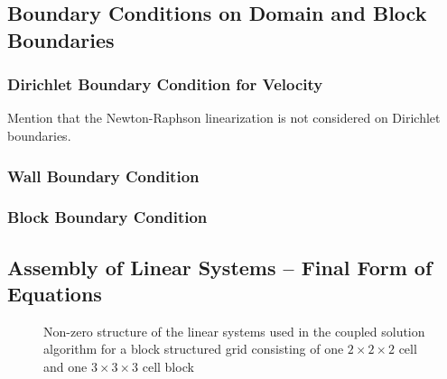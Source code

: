 \subsection{Boundary Conditions on Domain and Block Boundaries}

\subsubsection{Dirichlet Boundary Condition for Velocity}

Mention that the Newton-Raphson linearization is not considered on Dirichlet boundaries.


\subsubsection{Wall Boundary Condition}

\subsubsection{Block Boundary Condition}

\subsection{Assembly of Linear Systems -- Final Form of Equations}

\begin{figure}
  \centering
  \label{fig:segassemble}
  
  \caption{Non-zero structure of the linear systems used in the coupled solution algorithm for a block structured grid consisting of one  $2\times2\times2$ cell and one $3\times3\times3$ cell block}
\end{figure}
